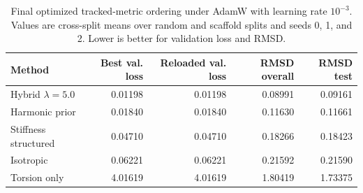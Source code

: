 \begin{table}[t]
\centering
\small
\caption{Final optimized tracked-metric ordering under AdamW with learning rate $10^{-3}$. Values are cross-split means over random and scaffold splits and seeds 0, 1, and 2. Lower is better for validation loss and RMSD.}
\label{tab:optimized-ordering}
\begin{tabular}{lrrrr}
\toprule
Method & Best val. loss & Reloaded val. loss & RMSD overall & RMSD test \\
\midrule
Hybrid $\lambda=5.0$ & 0.01198 & 0.01198 & 0.08991 & 0.09161 \\
Harmonic prior & 0.01840 & 0.01840 & 0.11630 & 0.11661 \\
Stiffness structured & 0.04710 & 0.04710 & 0.18266 & 0.18423 \\
Isotropic & 0.06221 & 0.06221 & 0.21592 & 0.21590 \\
Torsion only & 4.01619 & 4.01619 & 1.80419 & 1.73375 \\
\bottomrule
\end{tabular}
\end{table}

